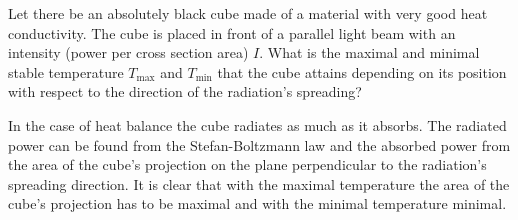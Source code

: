 {\ifEngStatement
Let there be an absolutely black cube made of a material with very good heat conductivity. The cube is placed in front of a parallel light beam with an intensity (power per cross section area) $I$. What is the maximal and minimal stable temperature $T_\text{max}$ and $T_\text{min}$ that the cube attains depending on its position with respect to the direction of the radiation’s spreading?
\fi


\ifEngHint
In the case of heat balance the cube radiates as much as it absorbs. The radiated power can be found from the Stefan-Boltzmann law and the absorbed power from the area of the cube’s projection on the plane perpendicular to the radiation’s spreading direction. It is clear that with the maximal temperature the area of the cube’s projection has to be maximal and with the minimal temperature minimal.
\fi


}
